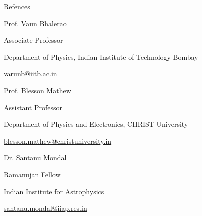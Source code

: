 \begin{rSection}{Refences}
\begin{rSubsection}{Prof. Vaun Bhalerao}{}{}{}
\vspace{-0.5em}
\item [] Associate Professor
\item []Department of Physics, Indian Institute of Technology Bombay
\item [] \href{mailto:varunb@iitb.ac.in}{varunb@iitb.ac.in}
\end{rSubsection}

\vspace{-0.5em}

\begin{rSubsection}{Prof. Blesson Mathew}{}{}{}
\vspace{-0.5em}
\item [] Assistant Professor
\item [] Department of Physics and Electronics, CHRIST University
\item [] \href{mailto:blesson.mathew@christuniversity.in}{blesson.mathew@christuniversity.in}
\end{rSubsection}

\vspace{-0.5em}

\begin{rSubsection}{Dr. Santanu Mondal}{}{}{}
\vspace{-0.5em}
\item [] Ramanujan Fellow
\item [] Indian Institute for Astrophysics
\item [] \href{mailto:santanu.mondal@iiap.res.in}{santanu.mondal@iiap.res.in}
\end{rSubsection}
\end{rSection}
